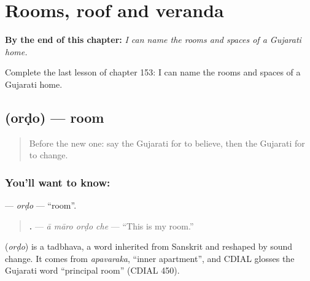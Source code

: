 
\chapter{Rooms, roof and veranda}
\label{ch:gu-rooms-roof-and-veranda}

\begin{chapteropening}
\textbf{By the end of this chapter:} \emph{I can name the rooms and spaces of a Gujarati home.}

Complete the last lesson of chapter 153: I can name the rooms and spaces of a Gujarati home.
\end{chapteropening}

\section[\texorpdfstring{\gu{ઓરડો} (orḍo)}{ઓરડો (orḍo)}]{ (orḍo) — room}

\label{lesson:GU-C153-ordo}



\begin{quote}
Before the new one: say the Gujarati for to believe, then the Gujarati for to change.
\end{quote}

\subsection*{You'll want to know: }
\textbf{} — \emph{orḍo} — \textquotedblleft{}room\textquotedblright{}.

\begin{quote}
\textbf{   .} — \emph{ā māro orḍo che} — \textquotedblleft{}This is my room.\textquotedblright{}
\end{quote}

\begin{cousinweb}
\textbf{} (\emph{orḍo}) is a tadbhava, a word inherited from Sanskrit and reshaped by sound change. It comes from \emph{apavaraka}, \textquotedblleft{}inner apartment\textquotedblright{}, and CDIAL glosses the Gujarati word \textquotedblleft{}principal room\textquotedblright{} (CDIAL 450).
\end{cousinweb}

